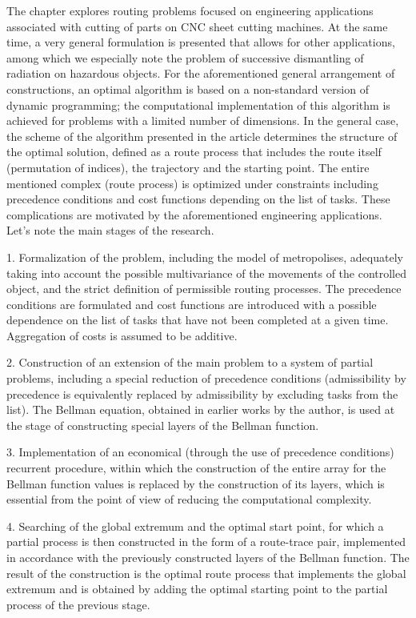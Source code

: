 The chapter explores routing problems focused on engineering applications associated with cutting of parts on CNC sheet cutting machines. At the same time, a very general formulation is presented that allows for other applications, among which we especially note the problem of successive dismantling of radiation on hazardous objects. For the aforementioned general arrangement of constructions, an optimal algorithm is based on a non-standard version of dynamic programming; the computational implementation of this algorithm is achieved for problems with a limited number of dimensions. In the general case, the scheme of the algorithm presented in the article determines the structure of the optimal solution, defined as a route process that includes the route itself (permutation of indices), the trajectory and the starting point. The entire mentioned complex (route process) is optimized under constraints including precedence conditions and cost functions depending on the list of tasks. These complications are motivated by the aforementioned engineering applications. Let's note the main stages of the research.

1. Formalization of the problem, including the model of metropolises, adequately taking into account the possible multivariance of the movements of the controlled object, and the strict definition of permissible routing processes. The precedence conditions are formulated and cost functions are introduced with a possible dependence on the list of tasks that have not been completed at a given time. Aggregation of costs is assumed to be additive.

2. Construction of an extension of the main problem to a system of partial problems, including a special reduction of precedence conditions (admissibility by precedence is equivalently replaced by admissibility by excluding tasks from the list). The Bellman equation, obtained in earlier works by the author, is used at the stage of constructing special layers of the Bellman function.

3. Implementation of an economical (through the use of precedence conditions) recurrent procedure, within which the construction of the entire array for the Bellman function values is replaced by the construction of its layers, which is essential from the point of view of reducing the computational complexity.

4. Searching of the global extremum and the optimal start point, for which a partial process is then constructed in the form of a route-trace pair, implemented in accordance with the previously constructed layers of the Bellman function. The result of the construction is the optimal route process that implements the global extremum and is obtained by adding the optimal starting point to the partial process of the previous stage.

